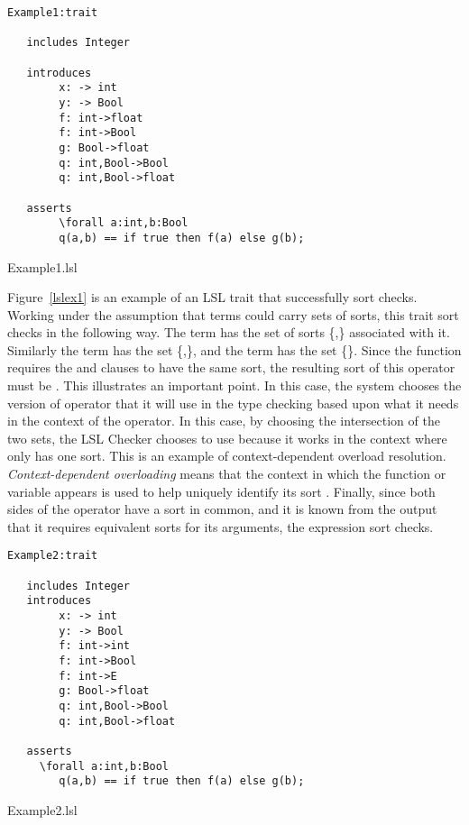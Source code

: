 \begin{BFIGURE}
\begin{verbatim}
Example1:trait

   includes Integer

   introduces
        x: -> int
        y: -> Bool
        f: int->float
        f: int->Bool
        g: Bool->float
        q: int,Bool->Bool
        q: int,Bool->float

   asserts
        \forall a:int,b:Bool
        q(a,b) == if true then f(a) else g(b);
\end{verbatim}
\caption{Example1.lsl}
\label{lslex1}
\end{BFIGURE}

Figure~\ref{lslex1} is an example of an LSL trait that successfully
sort checks. Working under the assumption that terms could carry sets
of sorts, this trait sort checks in the following way. The term
 has the set of sorts
\{,\} associated with it. Similarly the
term  has the set
\{,\}, and the term 
has the set \{\}. Since the
 function requires the  and
 clauses to have the same sort, the
resulting sort of this operator must be . This
illustrates an important point. In this case, the system chooses the
version of operator  that it will use in the type checking
based upon what it needs in the context of the 
operator. In this case, by choosing the intersection
of the two sets, the LSL Checker chooses to use  because it
works in the context where  only has one sort. This is an
example of context-dependent overload
resolution. \emph{Context-dependent overloading} means that the
context in which the function or variable appears is used to help uniquely identify
its sort \cite{Watt90}. Finally, since both sides of the \reserved{==}
operator have a sort in common, and it is known from the
 output that it requires equivalent sorts for its
arguments, the expression sort checks. 

\begin{BFIGURE}
\begin{verbatim}
Example2:trait

   includes Integer
   introduces
        x: -> int
        y: -> Bool
        f: int->int
        f: int->Bool
        f: int->E
        g: Bool->float
        q: int,Bool->Bool
        q: int,Bool->float

   asserts
     \forall a:int,b:Bool
        q(a,b) == if true then f(a) else g(b);
\end{verbatim}
\caption{Example2.lsl}
\label{lslex2}
\end{BFIGURE}


